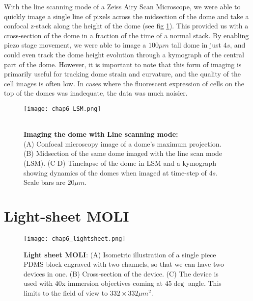 With the line scanning mode of a Zeiss Airy Scan Microscope, we were able to quickly image a single line of pixels across the midsection of the dome and take a confocal z-stack along the height of the dome (see fig \ref{fig_6_7}). This provided us with a cross-section of the dome in a fraction of the time of a normal stack. By enabling piezo stage movement, we were able to image a $100\mu m$ tall dome in just $4s$, and could even track the dome height evolution through a kymograph of the central part of the dome. However, it is important to note that this form of imaging is primarily useful for tracking dome strain and curvature, and the quality of the cell images is often low. In cases where the fluorescent expression of cells on the top of the domes was inadequate, the data was much noisier.  

\begin{figure}[h!]
	\begin{minipage}[c]{0.6\textwidth}
		\texttt{[image: chap6\_LSM.png]}
	\end{minipage}\hfill
	\begin{minipage}[c]{0.35\textwidth}
		\caption{\\ \textbf{Imaging the dome with Line scanning mode:}\\ (A) Confocal microscopy image of a dome's maximum projection. (B) Midsection of the same dome imaged with the line scan mode (LSM). (C-D) Timelapse of the dome in LSM and a kymograph showing dynamics of the domes when imaged at time-step of $4s$. Scale bars are $20 \mu m$.
		} \label{fig_6_7}
	\end{minipage}
\end{figure}

\hypertarget{light-sheet-moli}{%
\section{Light-sheet MOLI}\label{light-sheet-moli}}

\begin{figure}[h]
	\centering
	\texttt{[image: chap6\_lightsheet.png]}
	\caption{ \textbf{Light sheet MOLI}: (A) Isometric illustration of a single piece PDMS block engraved with two channels, so that we can have two devices in one. (B) Cross-section of the device. (C) The device is used with 40x immersion objectives coming at $45 \deg$ angle. This limits to the field of view to $332\times 332\mu m^2$.
	}\label{fig_6_8}
\end{figure}

